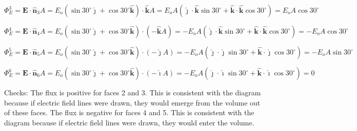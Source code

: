 \documentclass{article}
\newcommand{\ihat}[0]{\hat{\boldsymbol{\imath}}}
\newcommand{\jhat}[0]{\hat{\boldsymbol{\jmath}}}
\newcommand{\khat}[0]{\hat{\boldsymbol{k}}}
\begin{document}
$$\Phi_E^3=\mathbf{E}\cdot \hat{\mathbf{n}}_3A=E_o(\sin 30^\circ\jhat+\cos 30^\circ\khat)\cdot\khat A = E_oA(\jhat\cdot\khat\sin 30^\circ+\khat\cdot\khat\cos 30^\circ)=E_oA\cos 30^\circ$$

$$\Phi_E^4=\mathbf{E}\cdot \hat{\mathbf{n}}_4A=E_o(\sin 30^\circ\jhat+\cos 30^\circ\khat)\cdot(-\khat A) = -E_oA(\jhat\cdot\khat\sin 30^\circ+\khat\cdot\khat\cos 30^\circ)=-E_oA\cos 30^\circ$$

$$\Phi_E^5=\mathbf{E}\cdot \hat{\mathbf{n}}_5A=E_o(\sin 30^\circ\jhat+\cos 30^\circ\khat)\cdot(-\jhat A) = -E_oA(\jhat\cdot\jhat\sin 30^\circ+\khat\cdot\jhat\cos 30^\circ)=-E_oA\sin 30^\circ$$

$$\Phi_E^6=\mathbf{E}\cdot \hat{\mathbf{n}}_6A=E_o(\sin 30^\circ\jhat+\cos 30^\circ\khat)\cdot(-\ihat A) =  -E_oA(\jhat\cdot\ihat\sin 30^\circ+\khat\cdot\ihat\cos 30^\circ)=0$$

Checks: The flux is positive for faces 2 and 3. This is consistent with the diagram because if electric field lines were drawn, they would emerge from the volume out of these faces. The flux is negative for faces 4 and 5. This is consistent with the diagram because if electric field lines were drawn, they would enter the volume.
\fi
\end{document}

